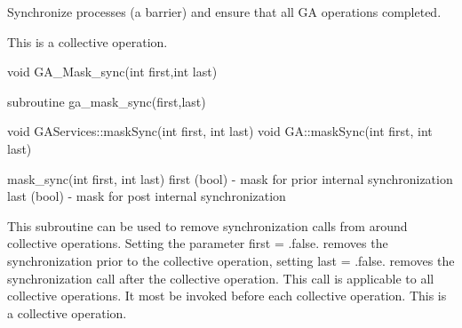 \documentclass[12pt]{article}
\begin{document}
\begin{desc}

Synchronize processes (a barrier) and ensure that all GA operations completed.

This is a collective operation.

\end{desc}


\begin{capi}
\begin{ccode}
void GA_Mask_sync(int first,int last)
\end{ccode}
\begin{funcargs}
\end{funcargs}
\end{capi}

\begin{fapi}
\begin{fcode}
subroutine ga_mask_sync(first,last)
\end{fcode}
\begin{funcargs}
\end{funcargs}
\end{fapi}

\begin{cxxapi}
\begin{cxxcode}
void GAServices::maskSync(int first, int last)
void GA::maskSync(int first, int last)
\end{cxxcode}
\begin{funcargs}
\end{funcargs}
\end{cxxapi}

\begin{pyapi}
\begin{pycode}
mask_sync(int first, int last)
   first (bool)   - mask for prior internal synchronization
   last (bool)    - mask for post internal synchronization
\end{pycode}
\end{pyapi}
\dcoll
\begin{desc}

This subroutine can be used to remove synchronization calls from around collective
operations. Setting the parameter first = .false. removes the synchronization prior
to the collective operation, setting last = .false. removes the synchronization call
after the collective operation. This call is applicable to all collective operations.
It most be invoked before each collective operation.
This is a  collective operation.

\end{desc}
\end{document}
